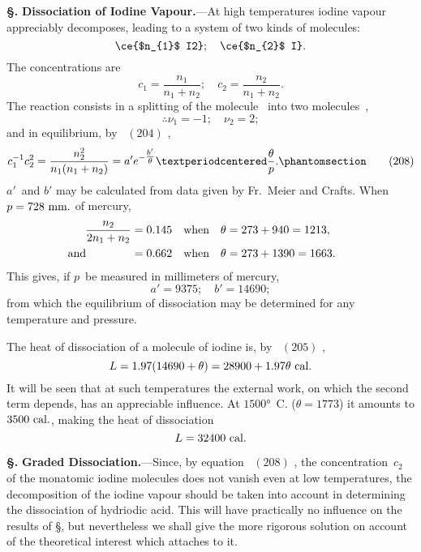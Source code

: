 \documentclass[12pt]{book}[2005/09/16]
\newcommand{\Chg}[2]{#2}
\newcommand{\Add}[1]{\Chg{}{#1}}
\newcommand{\Section}[1]{
  \medskip\par\textbf{§\;#1}
  \label{section:#1}
}
\newcommand{\SecRef}[2][§\;]{\hyperref[section:#2.]{{\upshape #1#2}}}
\newcommand{\Tag}[1]{%
  \phantomsection\label{eqn:#1}\tag*{\ensuremath{#1}}%
}
\newcommand{\Eq}[1]{%
  \hyperref[eqn:#1]{\ensuremath{#1}}%
}
\newcommand{\PageSep}[1]{\ignorespaces}
\newcommand{\Topic}[1]{\textbf{#1}}
\newcommand{\efrac}[2]{\tfrac{#1}{#2}}
\newcommand{\Unit}[1]{\text{\upshape #1}}
\begin{document}
\Section{246.} \Topic{Dissociation of Iodine Vapour.}---At high temperatures
iodine vapour appreciably decomposes, leading to
a system of two kinds of molecules:
\[
\ce{$n_{1}$ I2};\quad
\ce{$n_{2}$ I}.
\]
The concentrations are
\[
c_{1} = \frac{n_{1}}{n_{1} + n_{2}};\quad
c_{2} = \frac{n_{2}}{n_{1} + n_{2}}.
\]
The reaction consists in a splitting of the molecule~ into
two molecules~,
\[
\therefore
\nu_{1} = - 1;\quad
\nu_{2} = 2;
\]
and in equilibrium, by~\Eq{(204)},
\[
c_{1}^{-1} c_{2}^{2} = \frac{n_{2}^{2}}{n_{1} (n_{1} + n_{2})}
  = a' e^{-\efrac{b'}{\theta}} · \frac{\theta}{p}\Add{.}
\Tag{(208)}
\]
$a'$~and $b'$ may be calculated from data given by Fr.~Meier
and Crafts. When $p = 728~\Unit{mm.}$ of mercury,
%
%
\begin{align*}
\frac{n_{2}}{2n_{1} + n_{2}} &= 0.145\quad\text{when}\quad \theta = 273 + 940 = 1213, \\
\llap{\text{and\qquad\qquad}} &= 0.662\quad\text{when}\quad \theta = 273 + 1390 = 1663.
\end{align*}
\PageSep{221}
This gives, if $p$~be measured in millimeters of mercury,
\[
a' = 9375;\quad
b' = 14690;
\]
from which the equilibrium of dissociation may be determined
%
for any temperature and pressure.

The heat of dissociation of a molecule of iodine is,
by~\Eq{(205)},
\[
L = 1.97 (14690 + \theta) = 28900 + 1.97\theta~\Unit{cal.}
\]
It will be seen that at such temperatures the external work,
on which the second term depends, has an appreciable
influence. At $1500°$~C. ($\theta = 1773$) it amounts to $3500~\Unit{cal.}$,
making the heat of dissociation
\[
L = 32400~\Unit{cal.}
\]

\Section{247.} \Topic{Graded Dissociation.}---Since, by equation~\Eq{(208)},
%
the concentration~$c_{2}$ of the monatomic iodine molecules does
not vanish even at low temperatures, the decomposition of
the iodine vapour should be taken into account in determining
the dissociation of hydriodic acid. This will have
practically no influence on the results of \SecRef{245}, but nevertheless
we shall give the more rigorous solution on account
of the theoretical interest which attaches to it.
\end{document}
